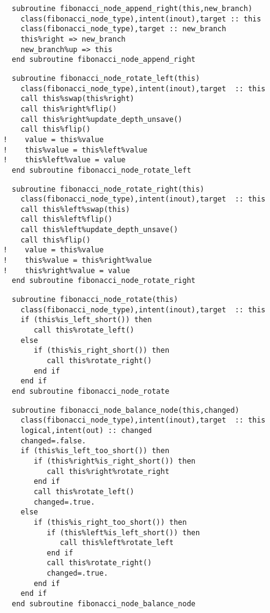 \begin{Verbatim}
  subroutine fibonacci_node_append_right(this,new_branch)
    class(fibonacci_node_type),intent(inout),target :: this
    class(fibonacci_node_type),target :: new_branch
    this%right => new_branch
    new_branch%up => this
  end subroutine fibonacci_node_append_right
\end{Verbatim}

\begin{Verbatim}
  subroutine fibonacci_node_rotate_left(this)
    class(fibonacci_node_type),intent(inout),target  :: this
    call this%swap(this%right)
    call this%right%flip()
    call this%right%update_depth_unsave()
    call this%flip()
!    value = this%value
!    this%value = this%left%value
!    this%left%value = value
  end subroutine fibonacci_node_rotate_left
\end{Verbatim}

\begin{Verbatim}
  subroutine fibonacci_node_rotate_right(this)
    class(fibonacci_node_type),intent(inout),target  :: this
    call this%left%swap(this)
    call this%left%flip()
    call this%left%update_depth_unsave()
    call this%flip()
!    value = this%value
!    this%value = this%right%value
!    this%right%value = value
  end subroutine fibonacci_node_rotate_right
\end{Verbatim}

\begin{Verbatim}
  subroutine fibonacci_node_rotate(this)
    class(fibonacci_node_type),intent(inout),target  :: this
    if (this%is_left_short()) then
       call this%rotate_left()
    else
       if (this%is_right_short()) then
          call this%rotate_right()
       end if
    end if
  end subroutine fibonacci_node_rotate
\end{Verbatim}

\begin{Verbatim}
  subroutine fibonacci_node_balance_node(this,changed)
    class(fibonacci_node_type),intent(inout),target  :: this
    logical,intent(out) :: changed
    changed=.false.
    if (this%is_left_too_short()) then
       if (this%right%is_right_short()) then
          call this%right%rotate_right
       end if
       call this%rotate_left()
       changed=.true.
    else
       if (this%is_right_too_short()) then
          if (this%left%is_left_short()) then
             call this%left%rotate_left
          end if
          call this%rotate_right()
          changed=.true.
       end if
    end if
  end subroutine fibonacci_node_balance_node
\end{Verbatim}

